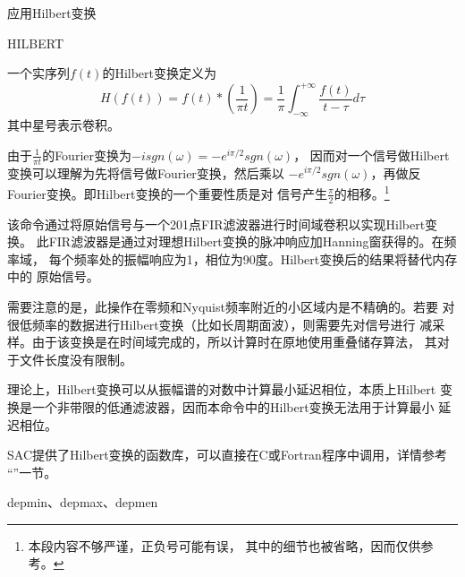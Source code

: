 \label{cmd:hilbert}

应用Hilbert变换

\begin{SACSTX}
HILBERT
\end{SACSTX}

一个实序列$f(t)$的Hilbert变换定义为
\[
    H(f(t)) = f(t) * (\frac{1}{\pi t}) =
    \frac{1}{\pi} \int_{-\infty}^{+\infty} \frac{f(t)}{t-\tau} d\tau
\]
其中星号表示卷积。

由于$\frac{1}{\pi t}$的Fourier变换为$-i sgn(\omega)=-e^{i\pi/2} sgn(\omega)$，
因而对一个信号做Hilbert变换可以理解为先将信号做Fourier变换，然后乘以
$-e^{i\pi/2} sgn(\omega)$，再做反Fourier变换。即Hilbert变换的一个重要性质是对
信号产生$\frac{\pi}{2}$的相移。\footnote{本段内容不够严谨，正负号可能有误，
其中的细节也被省略，因而仅供参考。}

该命令通过将原始信号与一个201点FIR滤波器进行时间域卷积以实现Hilbert变换。
此FIR滤波器是通过对理想Hilbert变换的脉冲响应加Hanning窗获得的。在频率域，
每个频率处的振幅响应为1，相位为90度。Hilbert变换后的结果将替代内存中的
原始信号。

需要注意的是，此操作在零频和Nyquist频率附近的小区域内是不精确的。若要
对很低频率的数据进行Hilbert变换（比如长周期面波），则需要先对信号进行
减采样。由于该变换是在时间域完成的，所以计算时在原地使用重叠储存算法，
其对于文件长度没有限制。

理论上，Hilbert变换可以从振幅谱的对数中计算最小延迟相位，本质上Hilbert
变换是一个非带限的低通滤波器，因而本命令中的Hilbert变换无法用于计算最小
延迟相位。

SAC提供了Hilbert变换的函数库，可以直接在C或Fortran程序中调用，详情参考
``''一节。

depmin、depmax、depmen
